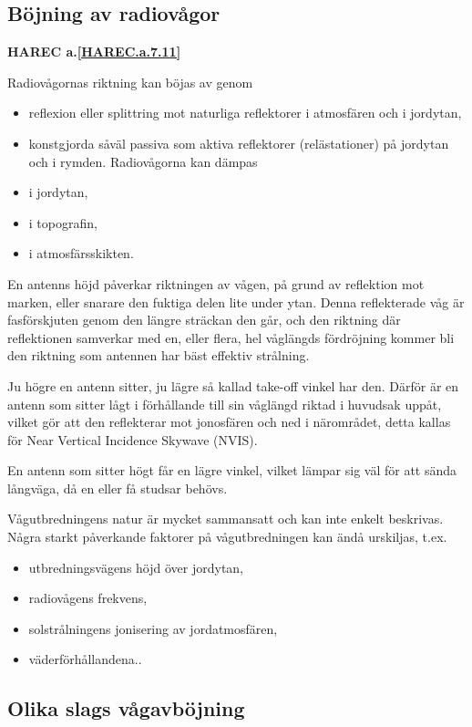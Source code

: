 \subsection{Böjning av radiovågor}
\textbf{HAREC a.\ref{HAREC.a.7.11}\label{myHAREC.a.7.11}}

Radiovågornas riktning kan böjas av genom
\begin{itemize}
\item reflexion eller splittring mot naturliga reflektorer i
  atmosfären och i jordytan,
\item konstgjorda såväl passiva som aktiva reflektorer (relästationer)
  på jordytan och i rymden.  Radiovågorna kan dämpas
\item i jordytan,
\item i topografin,
\item i atmosfärsskikten.
\end{itemize}

En antenns höjd påverkar riktningen av vågen, på grund av reflektion mot
marken, eller snarare den fuktiga delen lite under ytan.
Denna reflekterade våg är fasförskjuten genom den längre sträckan den går,
och den riktning där reflektionen samverkar med en, eller flera, hel våglängds
fördröjning kommer bli den riktning som antennen har bäst effektiv strålning.

Ju högre en antenn sitter, ju lägre så kallad take-off vinkel har den.
Därför är en antenn som sitter lågt i förhållande till sin våglängd riktad i
huvudsak uppåt, vilket gör att den reflekterar mot jonosfären och ned i
närområdet, detta kallas för Near Vertical Incidence Skywave (NVIS).

En antenn som sitter högt får en lägre vinkel, vilket lämpar sig väl för att
sända långväga, då en eller få studsar behövs.

Vågutbredningens natur är mycket sammansatt och kan inte enkelt
beskrivas. Några starkt påverkande faktorer på vågutbredningen kan
ändå urskiljas, t.ex.
\begin{itemize}
\item utbredningsvägens höjd över jordytan,
\item radiovågens frekvens,
\item solstrålningens jonisering av jordatmosfären,
\item väderförhållandena..
\end{itemize}

\subsection{Olika slags vågavböjning}

